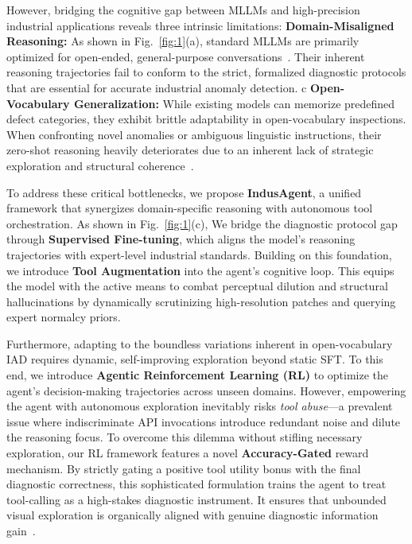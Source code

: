 \documentclass{llmxive}
\begin{document}
However, bridging the cognitive gap between MLLMs and high-precision industrial applications reveals three intrinsic limitations:  \textbf{Domain-Misaligned Reasoning:} As shown in Fig.~\ref{fig:1}(a), standard MLLMs are primarily optimized for open-ended, general-purpose conversations~\citep{liu2024visual}. Their inherent reasoning trajectories fail to conform to the strict, formalized diagnostic protocols that are essential for accurate industrial anomaly detection.  c  \textbf{Open-Vocabulary Generalization:} While existing models can memorize predefined defect categories, they exhibit brittle adaptability in open-vocabulary inspections. When confronting novel anomalies or ambiguous linguistic instructions, their zero-shot reasoning heavily deteriorates due to an inherent lack of strategic exploration and structural coherence~\citep{deepseekr1}.


To address these critical bottlenecks, we propose \textbf{IndusAgent}, a unified framework that synergizes domain-specific reasoning with autonomous tool orchestration. As shown in Fig.~\ref{fig:1}(c), We bridge the diagnostic protocol gap through \textbf{Supervised Fine-tuning}, which aligns the model's reasoning trajectories with expert-level industrial standards. Building on this foundation, we introduce \textbf{Tool Augmentation} into the agent's cognitive loop. This equips the model with the active means to combat perceptual dilution and structural hallucinations by dynamically scrutinizing high-resolution patches and querying expert normalcy priors. 

Furthermore, adapting to the boundless variations inherent in open-vocabulary IAD requires dynamic, self-improving exploration beyond static SFT. To this end, we introduce \textbf{Agentic Reinforcement Learning (RL)} to optimize the agent's decision-making trajectories across unseen domains. However, empowering the agent with autonomous exploration inevitably risks \emph{tool abuse}—a prevalent issue where indiscriminate API invocations introduce redundant noise and dilute the reasoning focus. To overcome this dilemma without stifling necessary exploration, our RL framework features a novel \textbf{Accuracy-Gated} reward mechanism. By strictly gating a positive tool utility bonus with the final diagnostic correctness, this sophisticated formulation trains the agent to treat tool-calling as a high-stakes diagnostic instrument. It ensures that unbounded visual exploration is organically aligned with genuine diagnostic information gain~\citep{schick2024toolformer, zeng2024agenttuning}.
\end{document}
